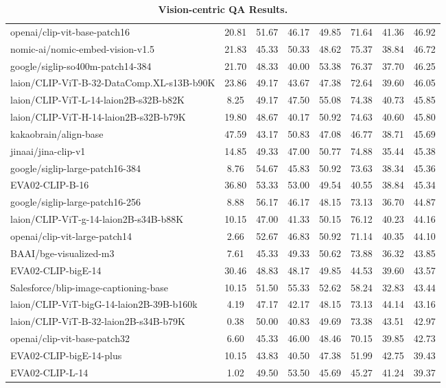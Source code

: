 \begin{table*}
{\begin{tabular}{lccccccc}
openai/clip-vit-base-patch16 &20.81 &51.67 &46.17 &49.85 &71.64 &41.36 &46.92 \\
nomic-ai/nomic-embed-vision-v1.5 &21.83 &45.33 &50.33 &48.62 &75.37 &38.84 &46.72 \\
google/siglip-so400m-patch14-384 &21.70 &48.33 &40.00 &53.38 &76.37 &37.70 &46.25 \\
laion/CLIP-ViT-B-32-DataComp.XL-s13B-b90K &23.86 &49.17 &43.67 &47.38 &72.64 &39.60 &46.05 \\
laion/CLIP-ViT-L-14-laion2B-s32B-b82K &8.25 &49.17 &47.50 &55.08 &74.38 &40.73 &45.85 \\
laion/CLIP-ViT-H-14-laion2B-s32B-b79K &19.80 &48.67 &40.17 &50.92 &74.63 &40.60 &45.80 \\
kakaobrain/align-base &47.59 &43.17 &50.83 &47.08 &46.77 &38.71 &45.69 \\
jinaai/jina-clip-v1 &14.85 &49.33 &47.00 &50.77 &74.88 &35.44 &45.38 \\
google/siglip-large-patch16-384 &8.76 &54.67 &45.83 &50.92 &73.63 &38.34 &45.36 \\
EVA02-CLIP-B-16 &36.80 &53.33 &53.00 &49.54 &40.55 &38.84 &45.34 \\
google/siglip-large-patch16-256 &8.88 &56.17 &46.17 &48.15 &73.13 &36.70 &44.87 \\
laion/CLIP-ViT-g-14-laion2B-s34B-b88K &10.15 &47.00 &41.33 &50.15 &76.12 &40.23 &44.16 \\
openai/clip-vit-large-patch14 &2.66 &52.67 &46.83 &50.92 &71.14 &40.35 &44.10 \\
BAAI/bge-visualized-m3 &7.61 &45.33 &49.33 &50.62 &73.88 &36.32 &43.85 \\
EVA02-CLIP-bigE-14 &30.46 &48.83 &48.17 &49.85 &44.53 &39.60 &43.57 \\
Salesforce/blip-image-captioning-base &10.15 &51.50 &55.33 &52.62 &58.24 &32.83 &43.44 \\
laion/CLIP-ViT-bigG-14-laion2B-39B-b160k &4.19 &47.17 &42.17 &48.15 &73.13 &44.14 &43.16 \\
laion/CLIP-ViT-B-32-laion2B-s34B-b79K &0.38 &50.00 &40.83 &49.69 &73.38 &43.51 &42.97 \\
openai/clip-vit-base-patch32 &6.60 &45.33 &46.00 &48.46 &70.15 &39.85 &42.73 \\
EVA02-CLIP-bigE-14-plus &10.15 &43.83 &40.50 &47.38 &51.99 &42.75 &39.43 \\
EVA02-CLIP-L-14 &1.02 &49.50 &53.50 &45.69 &45.27 &41.24 &39.37 \\
\bottomrule
\end{tabular}}
\caption{\textbf{Vision-centric QA Results.}}\label{tab: cv bench}
\end{table*}